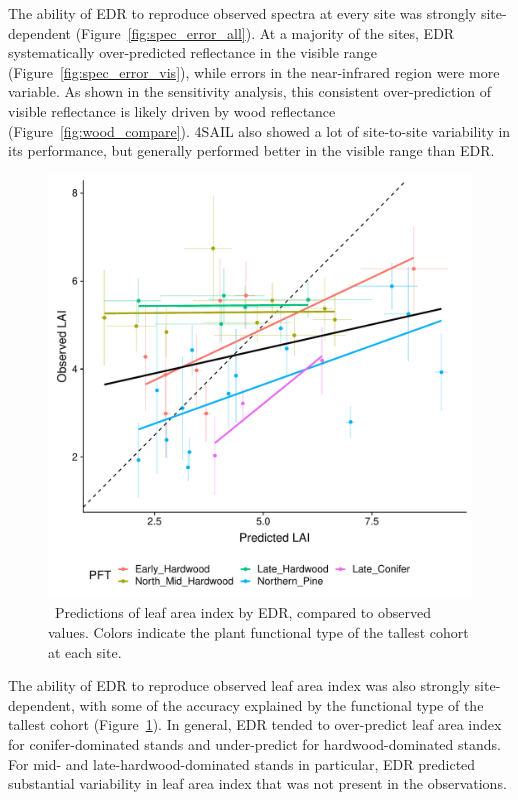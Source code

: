 The ability of EDR to reproduce observed spectra at every site was strongly site-dependent (Figure~\ref{fig:spec_error_all}).
At a majority of the sites, EDR systematically over-predicted reflectance in the visible range (Figure~\ref{fig:spec_error_vis}), while errors in the near-infrared region were more variable.
As shown in the sensitivity analysis, this consistent over-prediction of visible reflectance is likely driven by wood reflectance (Figure~\ref{fig:wood_compare}).
4SAIL also showed a lot of site-to-site variability in its performance, but generally performed better in the visible range than EDR\@.

\begin{figure}
  \centering
  \includegraphics[width=\textwidth]{4_edr/figures/explore_spectra/lai_scatter.pdf}
  \caption{\
    Predictions of leaf area index by EDR, compared to observed values.
    Colors indicate the plant functional type of the tallest cohort at each site.
  }\label{fig:lai_validation}
\end{figure}

The ability of EDR to reproduce observed leaf area index was also strongly site-dependent, with some of the accuracy explained by the functional type of the tallest cohort (Figure~\ref{fig:lai_validation}).
In general, EDR tended to over-predict leaf area index for conifer-dominated stands and under-predict for hardwood-dominated stands.
For mid- and late-hardwood-dominated stands in particular, EDR predicted substantial variability in leaf area index that was not present in the observations.

